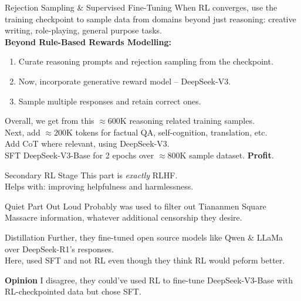 \documentclass{beamer}
\begin{document}
\begin{frame}{Rejection Sampling \& Supervised Fine-Tuning}
	When RL converges, use the training checkpoint to sample data from domains beyond just reasoning: creative writing, role-playing, general purpose tasks. \pause \newline \\

	\textbf{Beyond Rule-Based Rewards Modelling:} 
	\begin{enumerate}[label=\arabic*.]
		\item Curate reasoning prompts and rejection sampling from the checkpoint. \pause
		\item Now, incorporate generative reward model -- DeepSeek-V3. \pause
		\item Sample multiple responses and retain correct ones.
	\end{enumerate}
	Overall, we get from this $\approx 600$K reasoning related training samples. \pause \newline \\

	Next, add $\approx 200$K tokens for factual QA, self-cognition, translation, etc. \pause \newline \\

	Add CoT where relevant, using DeepSeek-V3. \pause \newline \\

	SFT DeepSeek-V3-Base for 2 epochs over $\approx 800$K sample dataset. \pause \textbf{Profit}.
\end{frame}

\begin{frame}{Secondary RL Stage}
	This part is \textit{exactly} RLHF. \pause \newline \\

	Helps with: improving helpfulness and harmlessness. \pause
	\begin{block}{Quiet Part Out Loud}
		Probably was used to filter out Tiananmen Square Massacre information, whatever additional censorship they desire.
	\end{block}
\end{frame}

\begin{frame}{Distillation}
	Further, they fine-tuned open source models like Qwen \& LLaMa over DeepSeek-R1's responses. \pause \newline \\

	Here, used SFT and not RL even though they think RL would peform better. \pause \newline \\

	\begin{block}{\bf Opinion}
		I disagree, they could've used RL to fine-tune DeepSeek-V3-Base with RL-checkpointed data but chose SFT.
	\end{block}

\end{frame}
\end{document}
